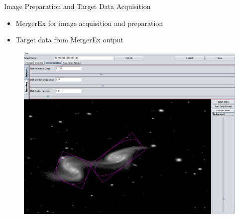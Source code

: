 \documentclass{beamer}
\begin{document}
\begin{frame}{Image Preparation and Target Data Acquisition}
    \begin{minipage}{0.5\linewidth}
    \begin{itemize}
        \item MergerEx \cite{Holincheck2015} for image acquisition and
            preparation
        \item Target data from MergerEx output
    \end{itemize}
    \end{minipage}%
    \begin{minipage}{0.5\linewidth}
        \begin{figure}[h]
            \centering
            \includegraphics[width=0.9\linewidth]{./images/mergerex.png}
        \end{figure}
    \end{minipage}
\end{frame}
\end{document}

